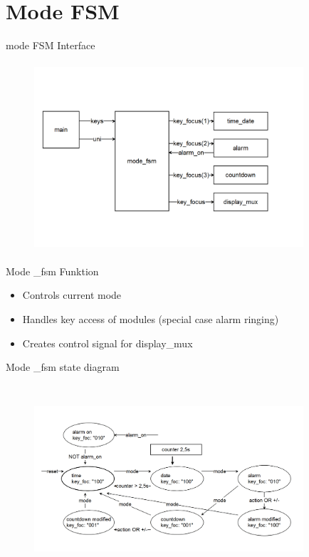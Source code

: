 \section{Mode FSM}
  \begin{frame}{mode FSM Interface}  
  	\begin{figure}
  		\includegraphics[width=100mm, height=70mm]{pictures/mode_fsm_interface.png}
  	\end{figure}
  \end{frame}
  
    \begin{frame}{Mode \_fsm Funktion}  
    	    \begin{itemize}
    	        \item Controls current mode
    	        \item Handles key access of modules (special case alarm ringing)
    	        \item Creates control signal for display\_mux
    	    \end {itemize}
    \end{frame}

  \begin{frame}{Mode \_fsm state diagram}
  	\begin{figure}
    	\includegraphics[width=100mm, height=70mm]{pictures/mode_fsm_state.png}
    \end{figure}
  \end{frame}



